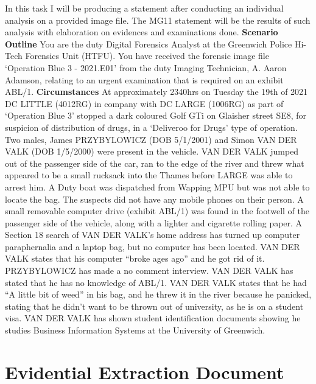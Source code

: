 In this task I will be producing a statement after conducting an individual
analysis on a provided image file. The MG11 statement will be the results of
such analysis with elaboration on evidences and examinations done.
\newline\newline\textbf{Scenario Outline}\newline
You are the duty Digital Forensics Analyst at the Greenwich
Police Hi-Tech Forensics Unit (HTFU). You have received the forensic image file
`Operation Blue 3 - 2021.E01' from the duty Imaging Technician, A\@. Aaron
Adamson, relating to an urgent examination that is required on an exhibit ABL/1.
\newline\newline\textbf{Circumstances}\newline
At approximately 2340hrs on Tuesday the 19th of 2021 DC LITTLE
(4012RG) in company with DC LARGE (1006RG) as part of `Operation Blue 3' stopped
a dark coloured Golf GTi on Glaisher street SE8, for suspicion of distribution
of drugs, in a `Deliveroo for Drugs' type of operation. Two males, James
PRZYBYLOWICZ (DOB 5/1/2001) and Simon VAN DER VALK (DOB 1/5/2000) were present
in the vehicle. VAN DER VALK jumped out of the passenger side of the car, ran to
the edge of the river and threw what appeared to be a small rucksack into the
Thames before LARGE was able to arrest him. A Duty boat was dispatched from
Wapping MPU but was not able to locate the bag. The suspects did not have any
mobile phones on their person. A small removable computer drive (exhibit ABL/1)
was found in the footwell of the passenger side of the vehicle, along with a
lighter and cigarette rolling paper. A Section 18 search of VAN DER VALK's home
address has turned up computer paraphernalia and a laptop bag, but no computer
has been located. VAN DER VALK states that his computer ``broke ages ago'' and
he got rid of it. PRZYBYLOWICZ has made a no comment interview. VAN DER VALK has
stated that he has no knowledge of ABL/1. VAN DER VALK states that he had ``A
little bit of weed'' in his bag, and he threw it in the river because he
panicked, stating that he didn't want to be thrown out of university, as he is
on a student visa. VAN DER VALK has shown student identification documents
showing he studies Business Information Systems at the University of Greenwich.

\section{Evidential Extraction Document}
\label{s:evidential-extraction-document}
